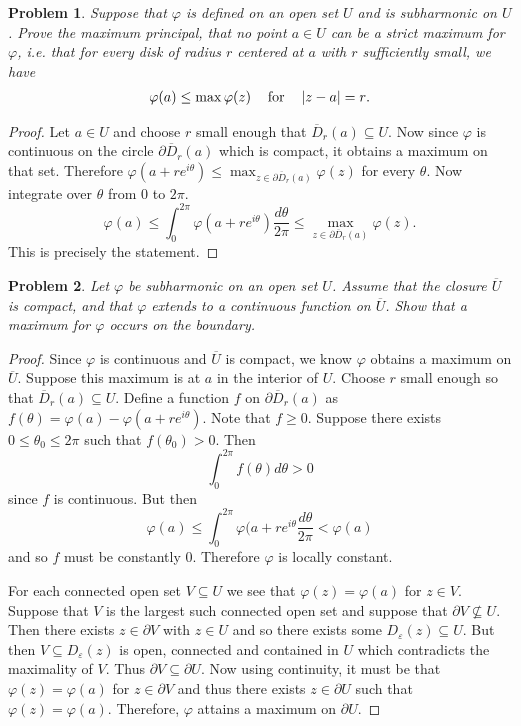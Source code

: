 \documentclass{article}
\newtheorem{problem}{Problem}
\begin{document}
\begin{problem}
Suppose that $\varphi$ is defined on an open set $U$ and is subharmonic on $U$. Prove the maximum principal, that no point $a \in U$ can be a strict maximum for $\varphi$, i.e. that for every disk of radius $r$ centered at $a$ with $r$ sufficiently small, we have
\[
\begin{tabular}{ccc}
$\varphi(a) \leq \max \varphi(z)$ & for & $|z-a| = r$.
\end{tabular}
\]
\end{problem}
\begin{proof}
Let $a \in U$ and choose $r$ small enough that $\overline{D}_r(a) \subseteq U$. Now since $\varphi$ is continuous on the circle $\partial \overline{D}_r(a)$ which is compact, it obtains a maximum on that set. Therefore $\varphi(a + re^{i \theta}) \leq \max_{z \in \partial \overline{D}_r(a)} \varphi(z)$ for every $\theta$. Now integrate over $\theta$ from $0$ to $2 \pi$.
\[
\varphi(a) \leq \int_0^{2\pi} \varphi(a + re^{i \theta}) \frac{d \theta}{2\pi} \leq \max_{z \in \partial \overline{D}_r(a)} \varphi(z).
\]
This is precisely the statement.
\end{proof}

\begin{problem}
\label{boundarymax}
Let $\varphi$ be subharmonic on an open set $U$. Assume that the closure $\overline{U}$ is compact, and that $\varphi$ extends to a continuous function on $\overline{U}$. Show that a maximum for $\varphi$ occurs on the boundary.
\end{problem}
\begin{proof}
Since $\varphi$ is continuous and $\overline{U}$ is compact, we know $\varphi$ obtains a maximum on $\overline{U}$. Suppose this maximum is at $a$ in the interior of $U$. Choose $r$ small enough so that $\overline{D}_r(a) \subseteq U$. Define a function $f$ on $\partial \overline{D}_r(a)$ as $f(\theta) = \varphi(a) - \varphi(a + re^{i \theta})$. Note that $f \geq 0$. Suppose there exists $0 \leq \theta_0 \leq 2 \pi$ such that $f(\theta_0) > 0$. Then
\[
\int_0^{2 \pi} f(\theta) d \theta > 0
\]
since $f$ is continuous. But then
\[
\varphi(a) \leq \int_0^{2 \pi} \varphi(a + r e^{i \theta} \frac{d \theta}{2 \pi} < \varphi (a)
\]
and so $f$ must be constantly $0$. Therefore $\varphi$ is locally constant.

For each connected open set $V \subseteq U$ we see that $\varphi(z) = \varphi(a)$ for $z \in V$. Suppose that $V$ is the largest such connected open set and suppose that $\partial V \nsubseteq U$. Then there exists $z \in \partial V$ with $z \in U$ and so there exists some $D_{\varepsilon}(z) \subseteq U$. But then $V \subseteq D_{\varepsilon}(z)$ is open, connected and contained in $U$ which contradicts the maximality of $V$. Thus $\partial V \subseteq \partial U$. Now using continuity, it must be that $\varphi(z) = \varphi(a)$ for $z \in \partial V$ and thus there exists $z \in \partial U$ such that $\varphi(z) = \varphi(a)$. Therefore, $\varphi$ attains a maximum on $\partial U$.
\end{proof}
\end{document}
